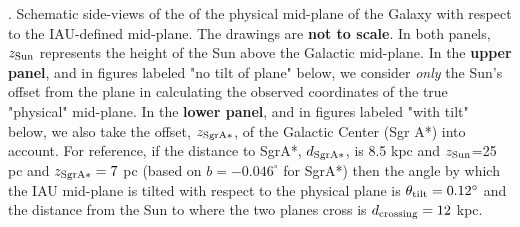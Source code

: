 \textbf{\label{fig:galcoords}}. Schematic side-views of the of the physical mid-plane of the Galaxy with respect to the IAU-defined mid-plane. The drawings are {\bf not to scale}. In both panels, $z_{\rm Sun}$ represents the height of the Sun above the Galactic mid-plane.  In the \textbf{upper panel}, and in figures labeled "no tilt of plane" below, we consider \textit{only} the Sun's offset from the plane in calculating the observed coordinates of the true "physical" mid-plane.  In the \textbf{lower panel}, and in figures labeled "with tilt" below, we also take the offset, $z_{\rm SgrA*}$, of the Galactic Center (Sgr A*) into account.  For reference, if the distance to SgrA*, $d_{\rm SgrA*}$, is 8.5 kpc and  $z_{\rm Sun}$=25 pc and $z_{\rm SgrA*}=7$ pc (based on $b=-0.046^\circ$ for SgrA*) then the angle by which the IAU mid-plane is tilted with respect to the physical plane is $\theta_{\rm tilt}=0.12^\circ$ and the distance from the Sun to where the two planes cross is $d_{\rm crossing} =12$ kpc.
